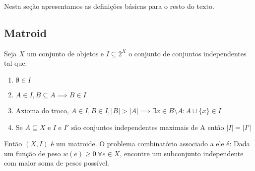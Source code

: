 Nesta seção apresentamos as definições básicas para o resto do texto.

\subsection{Matroid}
Seja $X$ um conjunto de objetos e $I \subseteq 2^X$ o conjunto de conjuntos independentes tal que:
\begin{enumerate}
\item $\emptyset \in I$
\item $A \in I, B \subseteq A \implies B \in I$
\item Axioma do troco, $A \in I, B \in I, |B| > |A| \implies \exists x \in B \setminus A : A \cup \{x\} \in I$
\item Se $A \subseteq X$ e $I$ e $I'$ são conjuntos independentes maximais de A então $|I| = |I'|$
\end{enumerate}
Então $(X, I)$ é um matroide. O problema combinatório associado a ele é: Dada um função de peso $w(e) \geq 0 ~\forall e \in X$, encontre um subconjunto independente com maior soma de pesos possível.
